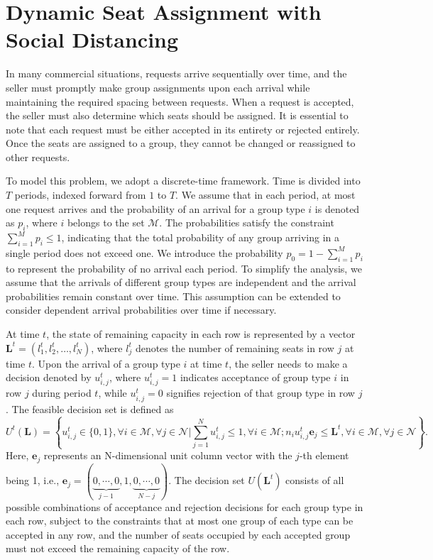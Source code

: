 \section{Dynamic Seat Assignment with Social Distancing}\label{sec_dynamic_seat}
In many commercial situations, requests arrive sequentially over time, and the seller must promptly make group assignments upon each arrival while maintaining the required spacing between requests. When a request is accepted, the seller must also determine which seats should be assigned. It is essential to note that each request must be either accepted in its entirety or rejected entirely. Once the seats are assigned to a group, they cannot be changed or reassigned to other requests.

To model this problem, we adopt a discrete-time framework. Time is divided into $T$ periods, indexed forward from $1$ to $T$. We assume that in each period, at most one request arrives and the probability of an arrival for a group type $i$ is denoted as $p_i$, where $i$ belongs to the set $\mathcal{M}$. The probabilities satisfy the constraint $\sum_{i=1}^M p_i \leq 1$, indicating that the total probability of any group arriving in a single period does not exceed one. We introduce the probability $p_0 = 1 - \sum_{i=1}^{M} p_i$ to represent the probability of no arrival each period. To simplify the analysis, we assume that the arrivals of different group types are independent and the arrival probabilities remain constant over time. This assumption can be extended to consider dependent arrival probabilities over time if necessary.

At time $t$, the state of remaining capacity in each row is represented by a vector $\mathbf{L}^{t} = (l_1^{t}, l_2^{t}, \ldots, l_N^{t})$, where $l_j^{t}$ denotes the number of remaining seats in row $j$ at time $t$. Upon the arrival of a group type $i$ at time $t$, the seller needs to make a decision denoted by $u_{i,j}^{t}$, where $u_{i,j}^{t} = 1$ indicates acceptance of group type $i$ in row $j$ during period $t$, while $u_{i,j}^{t} = 0$ signifies rejection of that group type in row $j$. The feasible decision set is defined as $$U^{t}(\mathbf{L}) = \left\{u_{i,j}^{t} \in \{0,1\}, \forall i \in \mathcal{M}, \forall j \in \mathcal{N} \big| \sum_{j=1}^{N} u_{i,j}^{t} \leq 1, \forall i \in \mathcal{M}; n_{i}u_{i,j}^{t}\mathbf{e}_j \leq \mathbf{L}^{t}, \forall i \in \mathcal{M}, \forall j \in \mathcal{N}\right\}.$$ 
Here, $\mathbf{e}_j$ represents an N-dimensional unit column vector with the $j$-th element being 1, i.e., $\mathbf{e}_j = (\underbrace{0, \cdots, 0}_{j-1}, 1, \underbrace{0, \cdots, 0}_{N-j})$. The decision set $U(\mathbf{L}^{t})$ consists of all possible combinations of acceptance and rejection decisions for each group type in each row, subject to the constraints that at most one group of each type can be accepted in any row, and the number of seats occupied by each accepted group must not exceed the remaining capacity of the row.


